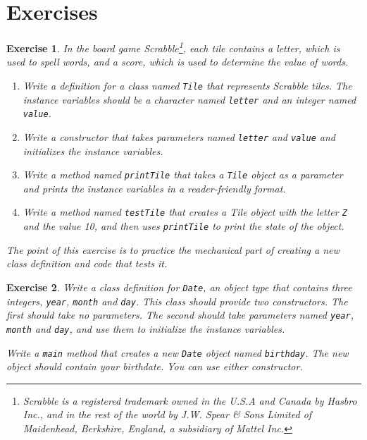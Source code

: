 \documentclass[12pt]{book}
\theoremstyle{exercise}
\newtheorem{exercise}{Exercise}[chapter]
\begin{document}
\section{Exercises}

\begin{exercise}
In the board game Scrabble\footnote{Scrabble is a registered trademark
owned in the U.S.A and Canada by Hasbro Inc., and in the rest of the world
by J.W. Spear \& Sons Limited of Maidenhead, Berkshire, England, a subsidiary
of Mattel Inc.}, each tile contains a letter, which is used to spell
words, and a score, which is used to determine the value of words.

\begin{enumerate}

\item Write a definition for a class named {\tt Tile}
that represents Scrabble tiles.  The instance variables should
be a character named {\tt letter} and an integer named {\tt value}.

\item Write a constructor that takes parameters named {\tt letter}
and {\tt value} and initializes the instance variables.

\item Write a method named {\tt printTile} that takes a {\tt Tile}
object as a parameter and prints the instance variables in
a reader-friendly format.

\item Write a method named {\tt testTile} that creates a
Tile object with the letter {\tt Z} and the value 10, and
then uses {\tt printTile} to print the state of the object.

\end{enumerate}

The point of this exercise is to practice the mechanical part
of creating a new class definition and code that tests it.
\end{exercise}


\begin{exercise}
Write a class definition for {\tt Date}, an object type that
contains three integers, {\tt year}, {\tt month} and {\tt day}.
This class should provide two constructors.  The first should
take no parameters.  The second should take parameters named
{\tt year}, {\tt month} and {\tt day}, and use them to initialize
the instance variables.

Write a {\tt main} method that creates a new {\tt Date} object
named {\tt birthday}.  The new object should contain your birthdate.
You can use either constructor.
\end{exercise}
\end{document}
